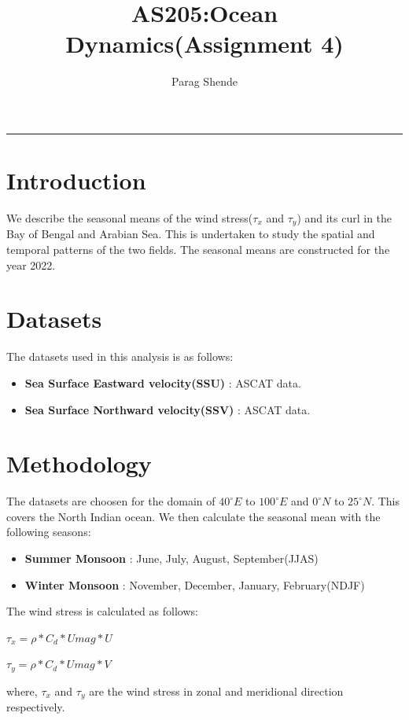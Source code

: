 \documentclass[20pt]{article}
\title{AS205:Ocean Dynamics(Assignment 4)}
\author{Parag Shende}
\begin{document}
\maketitle
\hrule

\section*{Introduction}

We describe the seasonal means of the wind stress($\tau_{x}$ and $\tau_{y}$) and its curl in the Bay of Bengal and Arabian Sea. This is 
undertaken to study the spatial and temporal patterns of the two fields. The seasonal means are constructed for the year 2022.

\section*{Datasets}

The datasets used in this analysis is as follows:

\begin{itemize}
    \item \textbf{Sea Surface Eastward velocity(SSU)} : ASCAT data.
    \item \textbf{Sea Surface Northward velocity(SSV)} : ASCAT data.
\end{itemize}

\section*{Methodology}

The datasets are choosen for the domain of $40^{\circ} E$ to $100^{\circ}E$ and $0^{\circ} N$ to $25^{\circ} N$. This covers the
North Indian ocean. We then calculate the seasonal mean with the following seasons:
\begin{itemize}
    \item \textbf{Summer Monsoon} : June, July, August, September(JJAS)
    \item \textbf{Winter Monsoon} : November, December, January, February(NDJF)
\end{itemize}

The wind stress is calculated as follows:
\begin{center}
    $\tau_{x} = \rho*C_{d}*Umag*U$

    $\tau_{y} = \rho*C_{d}*Umag*V$    
\end{center}

where,
$\tau_{x}$ and $\tau_{y}$ are the wind stress in zonal and meridional direction respectively. 
\end{document}
